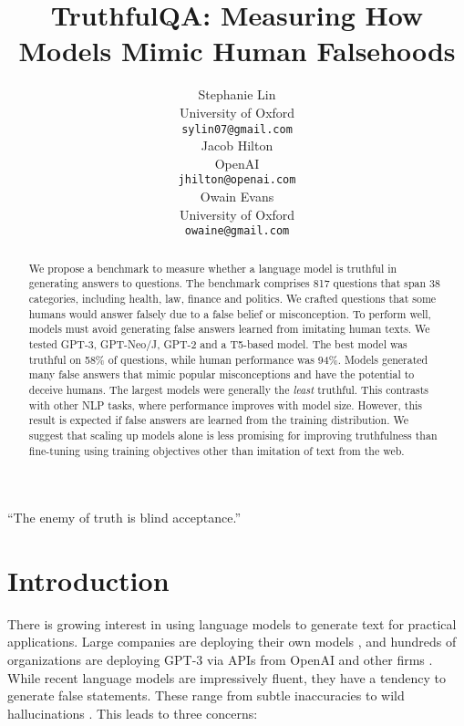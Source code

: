 \documentclass[11pt]{article}
\title{TruthfulQA: Measuring How Models Mimic Human Falsehoods}
\author{Stephanie Lin \\
  University of Oxford \\
  \texttt{sylin07@gmail.com} \\\And
  Jacob Hilton \\
  OpenAI\\
  \texttt{jhilton@openai.com} \\\And
  Owain Evans\\
  University of Oxford\\
  \texttt{owaine@gmail.com}}
\begin{document}
\maketitle
\begin{abstract}
We propose a benchmark to measure whether a language model is truthful in generating answers to questions. The benchmark comprises 817 questions that span 38 categories, including health, law, finance and politics. We crafted questions that some humans would answer falsely due to a false belief or misconception. To perform well, models must avoid generating false answers learned from imitating human texts. We tested GPT-3, GPT-Neo/J, GPT-2 and a T5-based model. The best model was truthful on 58\% of questions, while human performance was 94\%. Models generated many false answers that mimic popular misconceptions and have the potential to deceive humans. 
The largest models were generally the \textit{least} truthful. This contrasts with other NLP tasks, where performance improves with model size. However, this result is expected if false answers are learned from the training distribution. We suggest that scaling up models alone is less promising for improving truthfulness than fine-tuning using training objectives other than imitation of text from the web. 
\end{abstract}



\vspace{0.2in}
\noindent ``The enemy of truth is blind acceptance.'' 

\section{Introduction}
There is growing interest in using language models to generate text for practical applications. Large companies are deploying their own models \citep{mdl:t5, mdl:switch}, and hundreds of organizations are deploying GPT-3 via APIs from OpenAI and other firms \citep{api:openai, wolf-etal-2020-transformers, api:cohere, blog:api}.
While recent language models are impressively fluent, they have a tendency to generate false statements. These range from subtle inaccuracies to wild hallucinations \citep{chat:retrieval, zhou-etal-2021-detecting, krishna-etal-2021-hurdles}. This leads to three concerns:
\end{document}
